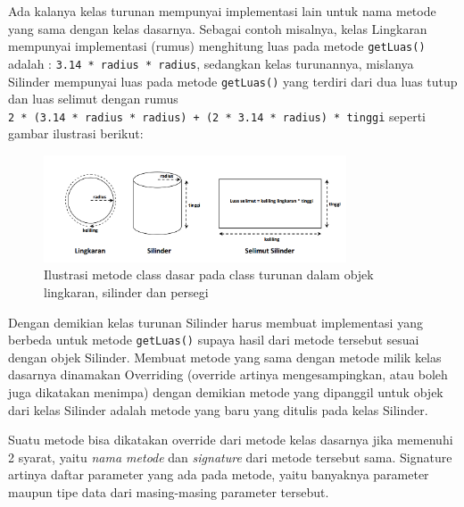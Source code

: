 Ada kalanya kelas turunan mempunyai implementasi lain untuk nama metode
yang sama dengan kelas dasarnya. Sebagai contoh misalnya, kelas
Lingkaran mempunyai implementasi (rumus) menghitung luas pada metode
\texttt{getLuas()} adalah : \texttt{3.14\ *\ radius\ *\ radius},
sedangkan kelas turunannya, mislanya Silinder mempunyai luas pada metode
\texttt{getLuas()} yang terdiri dari dua luas tutup dan luas selimut
dengan rumus
\texttt{2\ *\ (3.14\ *\ radius\ *\ radius)\ +\ (2\ *\ 3.14\ *\ radius)\ *\ tinggi}
seperti gambar ilustrasi berikut:

\begin{figure}[htbp]
\centering
\includegraphics[width=0.8\textwidth]{images/capture7-4.png}
\caption{Ilustrasi metode class dasar pada class turunan dalam objek lingkaran, silinder dan persegi}
\end{figure}

Dengan demikian kelas turunan Silinder harus membuat implementasi yang
berbeda untuk metode \texttt{getLuas()} supaya hasil dari metode
tersebut sesuai dengan objek Silinder. Membuat metode yang sama dengan
metode milik kelas dasarnya dinamakan Overriding (override artinya
mengesampingkan, atau boleh juga dikatakan menimpa) dengan demikian
metode yang dipanggil untuk objek dari kelas Silinder adalah metode yang
baru yang ditulis pada kelas Silinder.

Suatu metode bisa dikatakan override dari metode kelas dasarnya jika
memenuhi 2 syarat, yaitu \emph{nama metode} dan \emph{signature} dari
metode tersebut sama. Signature artinya daftar parameter yang ada pada
metode, yaitu banyaknya parameter maupun tipe data dari masing-masing
parameter tersebut.

